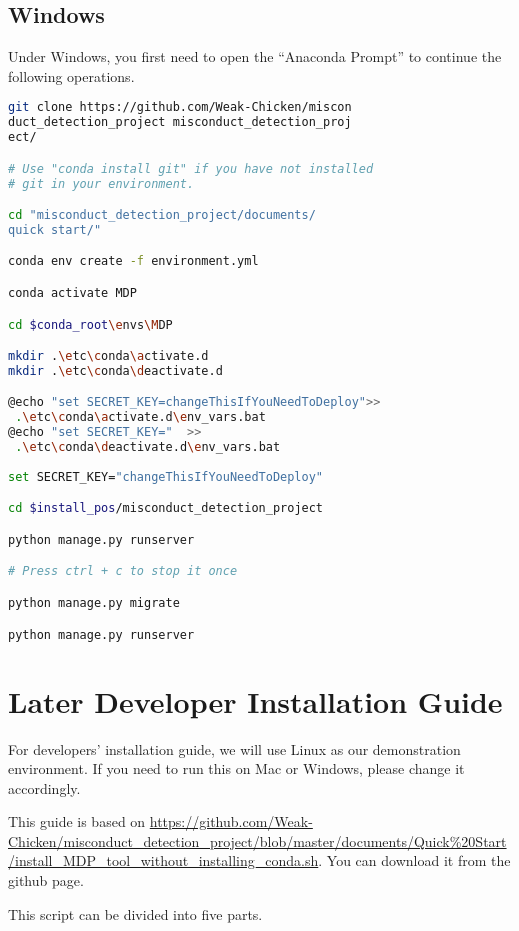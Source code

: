 \documentclass[twoside,a4paper]{refart}
\begin{document}
\subsection{Windows} \label{step_subsec:win}
Under Windows, you first need to open the \enquote{Anaconda Prompt} to continue the following operations.

\begin{lstlisting}[language=bash]
git clone https://github.com/Weak-Chicken/miscon
duct_detection_project misconduct_detection_proj
ect/

# Use "conda install git" if you have not installed
# git in your environment.

cd "misconduct_detection_project/documents/
quick start/"

conda env create -f environment.yml

conda activate MDP

cd $conda_root\envs\MDP

mkdir .\etc\conda\activate.d
mkdir .\etc\conda\deactivate.d

@echo "set SECRET_KEY=changeThisIfYouNeedToDeploy">>
 .\etc\conda\activate.d\env_vars.bat
@echo "set SECRET_KEY="  >>
 .\etc\conda\deactivate.d\env_vars.bat
 
set SECRET_KEY="changeThisIfYouNeedToDeploy"

cd $install_pos/misconduct_detection_project

python manage.py runserver

# Press ctrl + c to stop it once

python manage.py migrate

python manage.py runserver

\end{lstlisting}

\section{Later Developer Installation Guide} \label{sec:late}
For developers' installation guide, we will use Linux as our demonstration environment. If you need to run this on Mac or Windows, please change it accordingly.

This guide is based on \url{https://github.com/Weak-Chicken/misconduct_detection_project/blob/master/documents/Quick%20Start/install_MDP_tool_without_installing_conda.sh}. You can download it from the github page.

This script can be divided into five parts.
\end{document}
